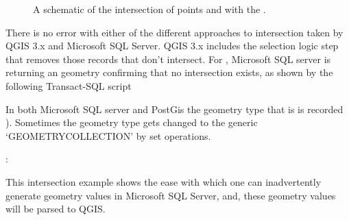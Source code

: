 \documentclass[a4paper,11pt,english]{sphinxmanual}
\begin{document}
\begin{figure}[htbp]
\centering
\capstart

\noindent{}
\caption{A schematic of the intersection of points  and  with the .}\label{\detokenize{background:id36}}\label{\detokenize{background:figurevi}}\end{figure}

There is no error with either of the different approaches to intersection taken by QGIS 3.x and Microsoft SQL Server.  QGIS 3.x includes the selection logic step that removes those records that don’t intersect.  For , Microsoft SQL server is returning an  geometry confirming that no intersection exists, as shown by the following Transact-SQL script %
\begin{footnote}[5]\sphinxAtStartFootnote
In both Microsoft SQL server and PostGis the geometry type that is  is recorded ).  Sometimes the geometry type gets changed to the generic ‘GEOMETRYCOLLECTION’ by set operations.
%
\end{footnote}:

\begin{sphinxVerbatim}[commandchars=\\\{\}]
    
    
 
 
\end{sphinxVerbatim}

This intersection example shows the ease with which one can inadvertently generate  geometry values in Microsoft SQL Server, and, these  geometry values will be parsed to QGIS.
\end{document}
